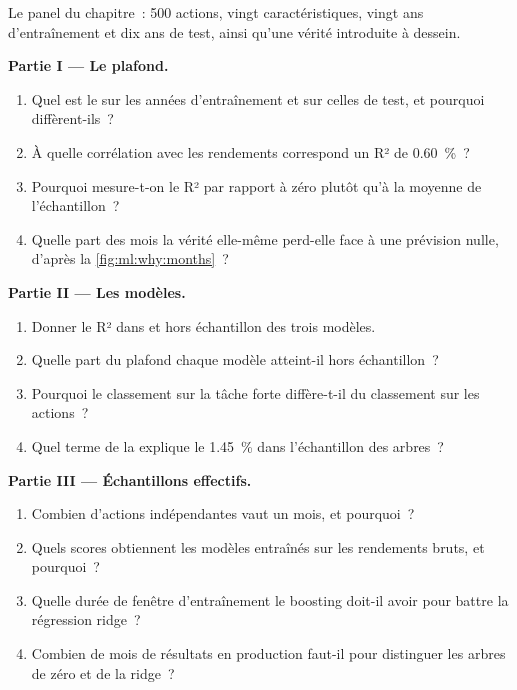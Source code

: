 \begin{problem}\label{pb:ml:why-financial-machine-learning-is-different:1}
Le panel du chapitre~: 500 actions, vingt caractéristiques, vingt ans d'entraînement et dix ans de test, ainsi qu'une vérité introduite à dessein.

\medskip\noindent\textbf{Partie I --- Le plafond.}
\begin{enumerate}
\item Quel est le  sur les années d'entraînement et sur celles de test, et pourquoi diffèrent-ils~?
\item À quelle corrélation avec les rendements correspond un R² de 0.60~\%~?
\item Pourquoi mesure-t-on le R² par rapport à zéro plutôt qu'à la moyenne de l'échantillon~?
\item Quelle part des mois la vérité elle-même perd-elle face à une prévision nulle, d'après la \cref{fig:ml:why:months}~?
\end{enumerate}

\medskip\noindent\textbf{Partie II --- Les modèles.}
\begin{enumerate}[resume]
\item Donner le R² dans et hors échantillon des trois modèles.
\item Quelle part du plafond chaque modèle atteint-il hors échantillon~?
\item Pourquoi le classement sur la tâche forte diffère-t-il du classement sur les actions~?
\item Quel terme de la  explique le 1.45~\% dans l'échantillon des arbres~?
\end{enumerate}

\medskip\noindent\textbf{Partie III --- Échantillons effectifs.}
\begin{enumerate}[resume]
\item Combien d'actions indépendantes vaut un mois, et pourquoi~?
\item Quels scores obtiennent les modèles entraînés sur les rendements bruts, et pourquoi~?
\item Quelle durée de fenêtre d'entraînement le boosting doit-il avoir pour battre la régression ridge~?
\item Combien de mois de résultats en production faut-il pour distinguer les arbres de zéro et de la ridge~?
\end{enumerate}


\end{problem}
